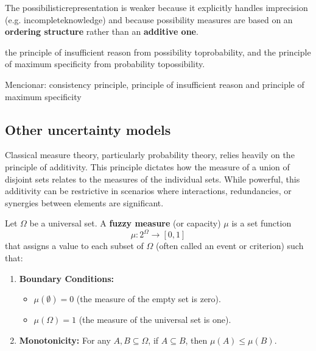 {The possibilisticrepresentation is weaker because it explicitly handles imprecision (e.g. incompleteknowledge) and because possibility measures are based on an \textbf{ordering structure} rather than an \textbf{additive one}.

the principle of insufficient reason from possibility toprobability, and the principle of maximum specificity from probability topossibility.

Mencionar: consistency principle, principle of insufficient reason and principle of maximum specificity
}


\subsection{Other uncertainty models}







Classical measure theory, particularly probability theory, relies heavily on the principle of additivity. This principle dictates how the measure of a union of disjoint sets relates to the measures of the individual sets. While powerful, this additivity can be restrictive in scenarios where interactions, redundancies, or synergies between elements are significant.

\begin{definition}
Let $\Omega$ be a universal set. A \textbf{fuzzy measure} (or capacity) $\mu$ is a set function
\[ \mu: 2^\Omega \to [0, 1] \]
that assigns a value to each subset of $\Omega$ (often called an event or criterion) such that:
\begin{enumerate}
    \item \textbf{Boundary Conditions:}
    \begin{itemize}
        \item $\mu(\emptyset) = 0$ (the measure of the empty set is zero).
        \item $\mu(\Omega) = 1$ (the measure of the universal set is one).
    \end{itemize}
    \item \textbf{Monotonicity:} For any $A, B \subseteq \Omega$, if $A \subseteq B$, then $\mu(A) \le \mu(B)$.
\end{enumerate}
\end{definition}

